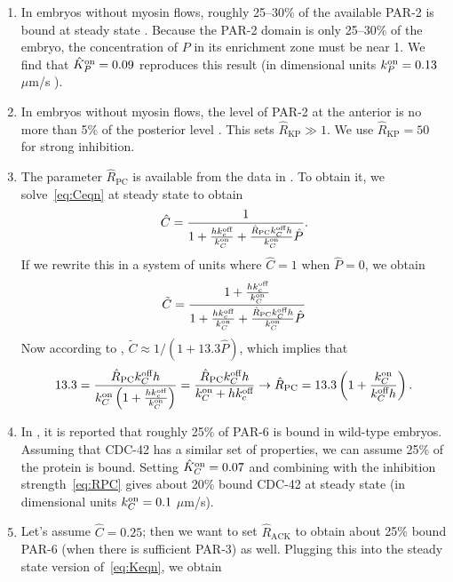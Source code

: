 \documentclass[11pt]{article}
\newcommand{\6}[1]{#1_{\text{6}}}
\newcommand{\3}[1]{#1_{\text{3}}}
\begin{document}
\begin{enumerate}
\item In embryos without myosin flows, roughly 25--30\% of the available PAR-2 is bound at steady state \cite[Fig.~S3]{gross2019guiding}. Because the PAR-2 domain is only 25--30\% of the embryo, the concentration of $P$ in its enrichment zone must be near 1. We find that $\hat{K}^\text{on}_P=0.09$ reproduces this result (in dimensional units $k^\text{on}_P=0.13$ $\mu$m/s \cite{gross2019guiding}).
\item In embryos without myosin flows, the level of PAR-2 at the anterior is no more than 5\% of the posterior level \cite[Fig.~2c]{gross2019guiding}. This sets $\hat R_\text{KP} \gg 1$. We use $\hat R_\text{KP}=50$ for strong inhibition. 
\item The parameter $\hat{R}_\text{PC}$ is available from the data in \cite{sailer2015dynamic}. To obtain it, we solve\ \eqref{eq:Ceqn} at steady state to obtain
\begin{equation}
\hat C = \frac{1}{1+\frac{h k^\text{off}_c}{k^\text{on}_C}+\frac{\hat R_\text{PC}k^\text{off}_C h}{k^\text{on}_C} \hat P}. 
\end{equation}
If we rewrite this in a system of units where $\hat C=1$ when $\hat P=0$, we obtain
\begin{equation*}
\tilde C =   \frac{1+\frac{h k^\text{off}_c}{k^\text{on}_C}}{1+\frac{h k^\text{off}_c}{k^\text{on}_C}+\frac{\hat R_\text{PC}k^\text{off}_C h}{k^\text{on}_C} \hat P}
\end{equation*} 
Now according to \cite{sailer2015dynamic}, $\tilde{C} \approx 1/(1+13.3\hat{P})$, which implies that 
\begin{equation}
\label{eq:RPC}
13.3 = \frac{\hat R_\text{PC}k^\text{off}_C h}{k^\text{on}_C\left(1+\frac{h k^\text{off}_c}{k^\text{on}_C}\right)}= \frac{\hat R_\text{PC}k^\text{off}_C h}{k^\text{on}_C+h k^\text{off}_c} \rightarrow \hat R_\text{PC}=13.3\left(1+\frac{k^\text{on}_C}{k^\text{off}_C h}\right).
\end{equation}
\item In \cite[Fig.~S3i]{gross2019guiding}, it is reported that roughly 25\% of PAR-6 is bound in wild-type embryos. Assuming that CDC-42 has a similar set of properties, we can assume 25\% of the protein is bound. Setting $\hat{K}^\text{on}_C=0.07$ and combining with the inhibition strength\ \eqref{eq:RPC} gives about 20\% bound CDC-42 at steady state (in dimensional units $k^\text{on}_C=0.1$ $\mu$m/s).
\item Let's assume $\hat C = 0.25$; then we want to set $\hat{R}_\text{ACK}$ to obtain about 25\% bound PAR-6 (when there is sufficient PAR-3) as well. Plugging this into the steady state version of\ \eqref{eq:Keqn}, we obtain

\end{enumerate}
\end{document}
